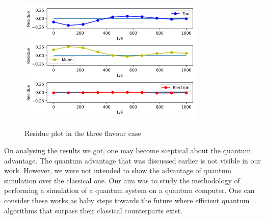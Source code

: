 \documentclass[12pt,a4paper]{report}
\begin{document}
\begin{figure}[h]
	\graphicspath{ {./Images/} }
	\centering	
	{\includegraphics[width=0.8\textwidth]{fig_11.png}}
	\caption{Residue plot in the three flavour case}
	\label{fig 11}
\end{figure}
On analysing the results we got, one may become sceptical about the quantum advantage. The quantum advantage that was discussed earlier is not visible in our work. However, we were not intended to show the advantage of quantum simulation over the classical one. Our aim was to study the methodology of performing a simulation of a quantum system on a quantum computer. One can consider these works as baby steps towards the future where efficient quantum algorithms that surpass their classical counterparts exist.
\end{document}
